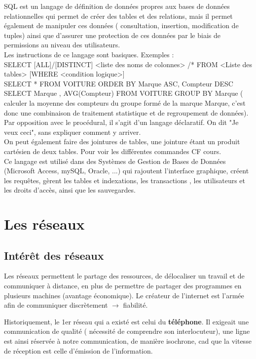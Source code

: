 \documentclass{report}
\begin{document}
SQL est un langage de définition de données propres aux bases de données relationnelles qui permet de créer des tables et des relations, mais il permet également de manipuler ces données ( consultation, insertion, modification de tuples) ainsi que d'assurer une protection de ces données par le biais de permissions au niveau des utilisateurs.\\
Les instructions de ce langage sont basiques.
Exemples : \\ SELECT [ALL]/[DISTINCT] <liste des noms de colonnes> /* FROM <Liste des tables> [WHERE <condition logique>]\\ SELECT * FROM VOITURE ORDER BY Marque ASC, Compteur DESC\\ SELECT Marque , AVG(Compteur) FROM VOITURE GROUP BY Marque ( calculer la moyenne des compteurs du groupe formé de la marque Marque, c'est donc une combinaison de traitement statistique et de regroupement de données). 
Par opposition avec le procédural, il s'agit d'un langage déclaratif. On dit "Je veux ceci", sans expliquer comment y arriver.\\
On peut également faire des jointures de tables, une jointure étant un produit cartésien de deux tables.
Pour voir les différentes commandes CF cours.\\
Ce langage est utilisé dans des Systèmes de Gestion de Bases de Données (Microsoft Access, mySQL, Oracle, ...) qui rajoutent l'interface graphique, créent les requêtes, gèrent les tables et indexations, les transactions , les utilisateurs et les droits d'accès, ainsi que les sauvegardes.

\chapter{Les réseaux}

\section{Intérêt des réseaux}

Les réseaux permettent le partage des ressources, de délocaliser un travail et de communiquer à distance, en plus de permettre de partager des programmes en plusieurs machines (avantage économique).  Le créateur de l'internet est l'armée afin de communiquer discrètement $\rightarrow$ fiabilité.

Historiquement, le 1er réseau qui a existé  est celui du {\bf téléphone}. Il exigeait une communication de qualité ( nécessité de comprendre son interlocuteur), une {ligne est ainsi réservée} à notre communication, de manière isochrone, cad que la vitesse de réception est celle d'émission de l'information.
\end{document}
